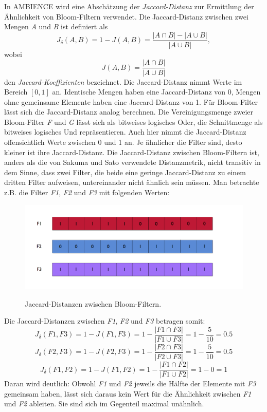 In AMBIENCE wird eine Abschätzung der \textit{Jaccard-Distanz} zur Ermittlung der Ähnlichkeit von Bloom-Filtern verwendet. Die Jaccard-Distanz zwischen zwei Mengen \textit{A} und \textit{B} ist definiert als 
\[J_{\delta}(A,B) = 1 - J(A,B) = \frac{|A\cap B| - |A\cup B|}{|A\cup B|}, \]
wobei 
\[J(A,B) = \frac{|A\cap B|}{|A\cup B|}\] den \textit{Jaccard-Koeffizienten} bezeichnet. Die Jaccard-Distanz nimmt Werte im Bereich $\left[0,1\right]$ an. Identische Mengen haben eine Jaccard-Distanz von 0, Mengen ohne gemeinsame Elemente haben eine Jaccard-Distanz von 1. 
Für Bloom-Filter lässt sich die Jaccard-Distanz analog berechnen. Die Vereinigungsmenge zweier Bloom-Filter \textit{F} und \textit{G} lässt sich als bitweises logisches Oder, die Schnittmenge als bitweises logisches Und repräsentieren. Auch hier nimmt die Jaccard-Distanz offensichtlich Werte zwischen 0 und 1 an. Je ähnlicher die Filter sind, desto kleiner ist ihre Jaccard-Distanz. 
Die Jaccard-Distanz zwischen Bloom-Filtern ist, anders als die von Sakuma und Sato verwendete Distanzmetrik, nicht transitiv in dem Sinne, dass zwei Filter, die beide eine geringe Jaccard-Distanz zu einem dritten Filter aufweisen, untereinander nicht ähnlich sein müssen. Man betrachte z.B. die Filter \textit{F1}, \textit{F2} und \textit{F3} mit folgenden Werten: 
\begin{figure}
  \centering
  \includegraphics[width=1.0\textwidth]{pictures/filters.png}\\
  \caption[Jaccard-Distanzen zwischen Bloom-Filtern]{Jaccard-Distanzen zwischen Bloom-Filtern.}\label{fig:pic1}
\end{figure}
\noindent
Die Jaccard-Distanzen zwischen \textit{F1}, \textit{F2} und \textit{F3} betragen somit: 
\[J_{\delta}(F1,F3) = 1 - J(F1,F3) = 1 - \frac{|F1\cap F3|}{|F1\cup F3|} = 1 - \frac{5}{10} = 0.5\]
\[J_{\delta}(F2,F3) = 1 - J(F2,F3) = 1 - \frac{|F2\cap F3|}{|F2\cup F3|} = 1 - \frac{5}{10} = 0.5\]
\[J_{\delta}(F1,F2) = 1 - J(F1,F2) = 1 - \frac{|F1\cap F2|}{|F1\cup F2|} = 1 - 0 = 1\]
Daran wird deutlich: Obwohl \textit{F1} und \textit{F2} jeweils die Hälfte der Elemente mit \textit{F3} gemeinsam haben, lässt sich daraus kein Wert für die Ähnlichkeit zwischen \textit{F1} und \textit{F2} ableiten. Sie sind sich im Gegenteil maximal unähnlich. 

